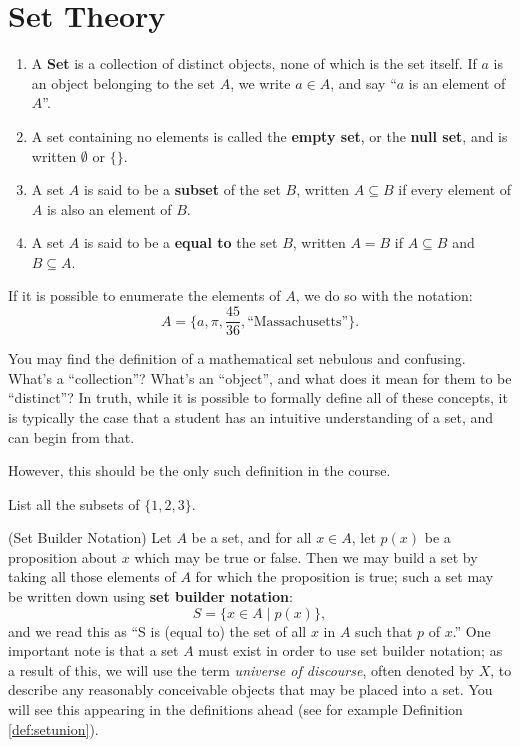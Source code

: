 \section{Set Theory}\label{sec:settheory}

\begin{definition}
\begin{enumerate}
    \item \label{def:set} A \textbf{Set} is a collection of distinct objects, none of which is the set itself.  If $a$ is an object belonging to the set $A$, we write $a \in A$, and say ``$a$ is an element of $A$''.
    \item \label{def:nullset} A set containing no elements is called the \textbf{empty set}, or the \textbf{null set}, and is written $\emptyset$ or $\{ \}$.
    \item \label{def:subset} A set $A$ is said to be a \textbf{subset} of the set $B$, written $A \subseteq B$ if every element of $A$ is also an element of $B$.
    \item \label{def:setequality} A set $A$ is said to be a \textbf{equal to} the set $B$, written $A = B$ if $A \subseteq B$ and $B \subseteq A$.
\end{enumerate}
\end{definition}

If it is possible to enumerate the elements of $A$, we do so with the notation:
$$ A = \{ a, \pi, \frac{45}{36}, \text{``Massachusetts''}\}.$$

\begin{remark} You may find the definition of a mathematical set nebulous and confusing.  What's a ``collection''?  What's an ``object'', and what does it mean for them to be ``distinct''?  In truth, while it is possible to formally define all of these concepts, it is typically the case that a student has an intuitive understanding of a set, and can begin from that.

However, this should be the only such definition in the course.
\end{remark}

\begin{exercise} List all the subsets of $\{1, 2, 3\}$.
\end{exercise}

\begin{notation} (Set Builder Notation) Let $A$ be a set, and for all $x \in A$, let $p(x)$ be a proposition about $x$ which may be true or false.  Then we may build a set by taking all those elements of $A$ for which the proposition is true; such a set may be written down using \textbf{set builder notation}:
    $$S = \{x\in A\mid p(x)\},$$
and we read this as ``S is (equal to) the set of all $x$ in $A$ such that $p$ of $x$.''  One important note is that a set $A$ must exist in order to use set builder notation; as a result of this, we will use the term \textit{universe of discourse}, often denoted by $X$, to describe any reasonably conceivable objects that may be placed into a set.  You will see this appearing in the definitions ahead (see for example Definition \ref{def:setunion}).
\end{notation}

